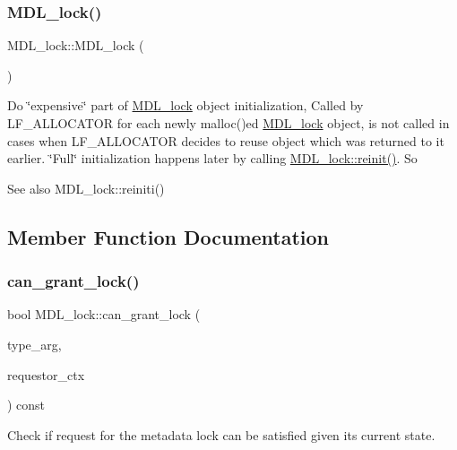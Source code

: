 \subsubsection{\texorpdfstring{M\+D\+L\+\_\+lock()}{MDL\_lock()}}
{\footnotesize\ttfamily M\+D\+L\+\_\+lock\+::\+M\+D\+L\+\_\+lock (\begin{DoxyParamCaption}{ }\end{DoxyParamCaption})\hspace{0.3cm}{\ttfamily [inline]}}

Do \char`\"{}expensive\char`\"{} part of \mbox{\hyperlink{classMDL__lock}{M\+D\+L\+\_\+lock}} object initialization, Called by L\+F\+\_\+\+A\+L\+L\+O\+C\+A\+T\+OR for each newly malloc()\textquotesingle{}ed \mbox{\hyperlink{classMDL__lock}{M\+D\+L\+\_\+lock}} object, is not called in cases when L\+F\+\_\+\+A\+L\+L\+O\+C\+A\+T\+OR decides to reuse object which was returned to it earlier. \char`\"{}\+Full\char`\"{} initialization happens later by calling \mbox{\hyperlink{classMDL__lock_aaa2f6326006b7c7ba179075c82707d59}{M\+D\+L\+\_\+lock\+::reinit()}}. So \begin{DoxySeeAlso}{See also}
M\+D\+L\+\_\+lock\+::reiniti() 
\end{DoxySeeAlso}


\subsection{Member Function Documentation}
\mbox{\label{classMDL__lock_a8d8e8e3b98525a6c8de14a745dd3ce8f}} 
\subsubsection{\texorpdfstring{can\+\_\+grant\+\_\+lock()}{can\_grant\_lock()}}
{\footnotesize\ttfamily bool M\+D\+L\+\_\+lock\+::can\+\_\+grant\+\_\+lock (\begin{DoxyParamCaption}\item[{enum\+\_\+mdl\+\_\+type}]{type\+\_\+arg,  }\item[{const \mbox{\hyperlink{classMDL__context}{M\+D\+L\+\_\+context}} $\ast$}]{requestor\+\_\+ctx }\end{DoxyParamCaption}) const}

Check if request for the metadata lock can be satisfied given its current state.


